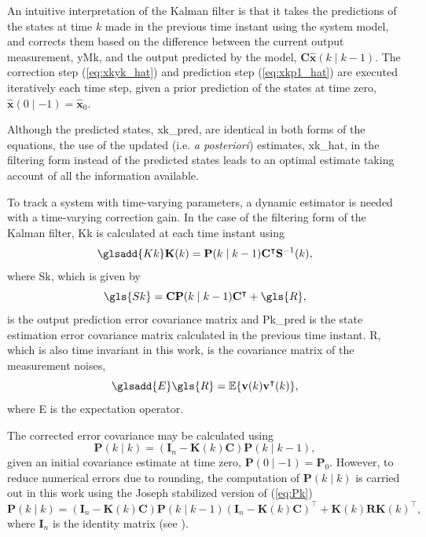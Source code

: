 An intuitive interpretation of the Kalman filter is that it takes the predictions of the states at time $k$ made in the previous time instant using the system model, and corrects them based on the difference between the current output measurement, \gls{yMk}, and the output predicted by the model, $\mathbf{C} \mathbf{\hat{x}}(k \mid k-1)$. The correction step (\ref{eq:xkyk_hat}) and prediction step (\ref{eq:xkp1_hat}) are executed iteratively each time step, given a prior prediction of the states at time zero, $\mathbf{\hat{x}}(0 \mid -1)=\mathbf{\hat{x}}_0$.

Although the predicted states, \gls{xk_pred}, are identical in both forms of the equations, the use of the updated (i.e. \textit{a posteriori}) estimates, \gls{xk_hat}, in the filtering form instead of the predicted states leads to an optimal estimate taking account of all the information available.

To track a system with time-varying parameters, a dynamic estimator is needed with a time-varying correction gain. In the case of the filtering form of the Kalman filter, \gls{Kk} is calculated at each time instant using
\begin{equation} \label{eq:Kk}
	\glsadd{Kk}\mathbf{K}(k) = \mathbf{P}(k \mid k-1)\mathbf{C}^\intercal \mathbf{S}^{-1}(k),
\end{equation}
where \gls{Sk}, which is given by
\begin{equation} \label{eq:Sk}
	\gls{Sk} = \mathbf{C}\mathbf{P}(k \mid k-1)\mathbf{C}^\intercal + \gls{R},
\end{equation}
is the output prediction error covariance matrix and \gls{Pk_pred} is the state estimation error covariance matrix calculated in the previous time instant. \gls{R}, which is also time invariant in this work, is the covariance matrix of the measurement noises,
\begin{equation} \label{eq:R} \glsadd{E}
	 \gls{R} = \mathbb{E}\{ \mathbf{v}(k) \mathbf{v}^\intercal(k) \},
\end{equation}
where \gls{E} is the expectation operator.

The corrected error covariance may be calculated using
\begin{equation} \label{eq:Pk}
	\mathbf{P}(k \mid k) = \left( \mathbf{I}_n - \mathbf{K}(k) \mathbf{C} \right) \mathbf{P}(k \mid k-1),
\end{equation}
given an initial covariance estimate at time zero, $\mathbf{P}(0 \mid -1)=\mathbf{P}_0$. However, to reduce numerical errors due to rounding, the computation of $\mathbf{P}(k \mid k)$ is carried out in this work using the Joseph stabilized version of (\ref{eq:Pk})
 \begin{equation} \label{eq:Pk-stab}
 	\mathbf{P}(k \mid k) = \left( \mathbf{I}_n - \mathbf{K}(k) \mathbf{C} \right ) \mathbf{P}(k \mid k-1) \left( \mathbf{I}_n - \mathbf{K}(k) \mathbf{C} \right )^\intercal + \mathbf{K}(k)  \mathbf{R} \mathbf{K}(k)^\intercal,
 \end{equation}
%
where $\mathbf{I}_n$ is the identity matrix (see \cite{lewis_optimal_2008}).

